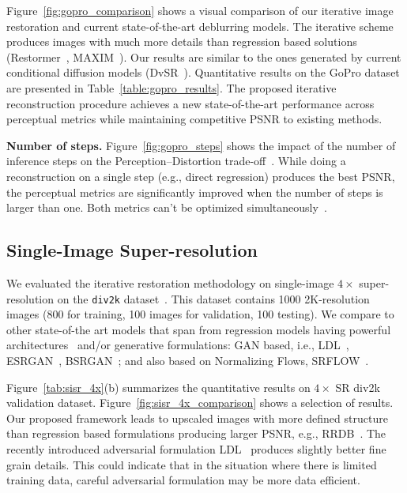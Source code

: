 \documentclass[10pt]{article} %
\begin{document}



Figure~\ref{fig:gopro_comparison} shows a visual comparison of our iterative image restoration and current state-of-the-art deblurring models. The iterative scheme produces images with much more details than regression based solutions (Restormer~\citep{zamir2022restormer}, MAXIM~\citep{tu2022maxim}). Our results are similar to the ones generated by current conditional diffusion models (DvSR~\citep{whang2022deblurring}).
Quantitative results on the GoPro dataset are presented in Table~\ref{table:gopro_results}. The proposed iterative reconstruction procedure achieves a new state-of-the-art performance across perceptual metrics while maintaining competitive PSNR to existing methods. 



\noindent \textbf{Number of steps.}
Figure~\ref{fig:gopro_steps} shows the impact of the number of inference steps on the Perception--Distortion trade-off~\citep{blau2018perception}. While doing a reconstruction on a single step (e.g., direct regression) produces the best PSNR, the perceptual metrics are significantly improved when the number of steps is larger than one. Both metrics can't be optimized simultaneously~\citep{blau2018perception}.


\subsection{Single-Image Super-resolution}
\label{sec:exp_super_res}

We evaluated the iterative restoration methodology on single-image $4\times$ super-resolution on the \texttt{div2k} dataset~\citep{div2k}. This dataset contains 1000 2K-resolution images (800 for training, 100 images for validation, 100 testing). We compare to other state-of-the art models that span from regression models having powerful architectures~\citep{wang2018esrgan,chen2021learning,liang2022details} and/or generative formulations: GAN based, i.e., LDL~\citep{liang2022details}, ESRGAN~\citep{wang2018esrgan}, BSRGAN~\citep{zhang2021designing}; and also based on Normalizing Flows, SRFLOW~\citep{lugmayr2020srflow}.




Figure~\ref{tab:sisr_4x}(b) summarizes the quantitative results on $4\times$ SR div2k validation dataset. Figure~\ref{fig:sisr_4x_comparison} shows a selection of results. Our proposed framework leads to upscaled images with more defined structure than regression based formulations producing larger PSNR, e.g., RRDB~\citep{wang2018esrgan}. The recently introduced adversarial formulation LDL~\citep{liang2022details} produces slightly better fine grain details. This could indicate that in the situation where there is limited training data, careful adversarial formulation may be more data efficient.
\end{document}
